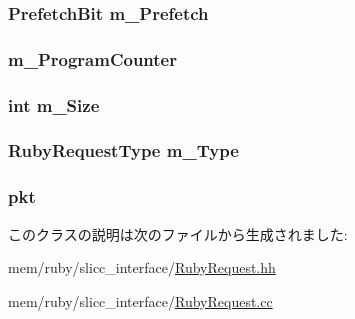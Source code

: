 \label{classRubyRequest_a7c96109098594912107df11d774fb074}
\hypertarget{classRubyRequest_af0ed8dc909378d2f8109d2c4a97d9495}{
\subsubsection[{m\_\-Prefetch}]{\setlength{\rightskip}{0pt plus 5cm}PrefetchBit {\bf m\_\-Prefetch}}}
\label{classRubyRequest_af0ed8dc909378d2f8109d2c4a97d9495}
\hypertarget{classRubyRequest_a969946fed3bff0265b5fb26d9142020d}{
\subsubsection[{m\_\-ProgramCounter}]{ {\bf m\_\-ProgramCounter}}}
\label{classRubyRequest_a969946fed3bff0265b5fb26d9142020d}
\hypertarget{classRubyRequest_a75eae7d22f07ee4b6bd79aca92932601}{
\subsubsection[{m\_\-Size}]{\setlength{\rightskip}{0pt plus 5cm}int {\bf m\_\-Size}}}
\label{classRubyRequest_a75eae7d22f07ee4b6bd79aca92932601}
\hypertarget{classRubyRequest_a0af11cf356fee21e4efa5af9c04f899f}{
\subsubsection[{m\_\-Type}]{\setlength{\rightskip}{0pt plus 5cm}RubyRequestType {\bf m\_\-Type}}}
\label{classRubyRequest_a0af11cf356fee21e4efa5af9c04f899f}
\hypertarget{classRubyRequest_a3a891bc2a0fcbe6be5297077d94e2df7}{
\subsubsection[{pkt}]{ {\bf pkt}}}
\label{classRubyRequest_a3a891bc2a0fcbe6be5297077d94e2df7}


このクラスの説明は次のファイルから生成されました:\begin{DoxyCompactItemize}
\item 
mem/ruby/slicc\_\-interface/\hyperlink{RubyRequest_8hh}{RubyRequest.hh}\item 
mem/ruby/slicc\_\-interface/\hyperlink{RubyRequest_8cc}{RubyRequest.cc}\end{DoxyCompactItemize}
